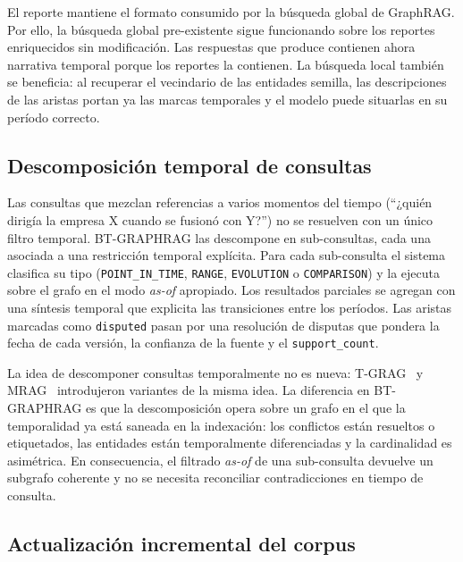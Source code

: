 
El reporte mantiene el formato consumido por la búsqueda global de GraphRAG. Por ello, la búsqueda global pre-existente sigue funcionando sobre los reportes enriquecidos sin modificación. Las respuestas que produce contienen ahora narrativa temporal porque los reportes la contienen. La búsqueda local también se beneficia: al recuperar el vecindario de las entidades semilla, las descripciones de las aristas portan ya las marcas temporales y el modelo puede situarlas en su período correcto.

\subsection{Descomposición temporal de consultas}

Las consultas que mezclan referencias a varios momentos del tiempo (``¿quién dirigía la empresa X cuando se fusionó con Y?'') no se resuelven con un único filtro temporal. BT-GRAPHRAG las descompone en sub-consultas, cada una asociada a una restricción temporal explícita. Para cada sub-consulta el sistema clasifica su tipo (\texttt{POINT\_IN\_TIME}, \texttt{RANGE}, \texttt{EVOLUTION} o \texttt{COMPARISON}) y la ejecuta sobre el grafo en el modo \emph{as-of} apropiado. Los resultados parciales se agregan con una síntesis temporal que explicita las transiciones entre los períodos. Las aristas marcadas como \texttt{disputed} pasan por una resolución de disputas que pondera la fecha de cada versión, la confianza de la fuente y el \texttt{support\_count}.

La idea de descomponer consultas temporalmente no es nueva: T-GRAG~\cite{tgrag2025} y MRAG~\cite{trek2025} introdujeron variantes de la misma idea. La diferencia en BT-GRAPHRAG es que la descomposición opera sobre un grafo en el que la temporalidad ya está saneada en la indexación: los conflictos están resueltos o etiquetados, las entidades están temporalmente diferenciadas y la cardinalidad es asimétrica. En consecuencia, el filtrado \emph{as-of} de una sub-consulta devuelve un subgrafo coherente y no se necesita reconciliar contradicciones en tiempo de consulta.

\subsection{Actualización incremental del corpus}

